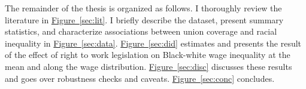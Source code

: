 \documentclass[11pt]{article}
\begin{document}
The remainder of the thesis is organized as follows. I thoroughly review the literature in \hyperref[sec:lit]{Figure~\ref*{sec:lit}}. I briefly describe the dataset, present summary statistics, and characterize associations between union coverage and racial inequality in \hyperref[sec:data]{Figure~\ref*{sec:data}}. \hyperref[sec:did]{Figure~\ref*{sec:did}} estimates and presents the result of the effect of right to work legislation on Black-white wage inequality at the mean and along the wage distribution. \hyperref[sec:disc]{Figure~\ref*{sec:disc}} discusses these results and goes over robustness checks and caveats. \hyperref[sec:conc]{Figure~\ref*{sec:conc}} concludes.

\end{document}
